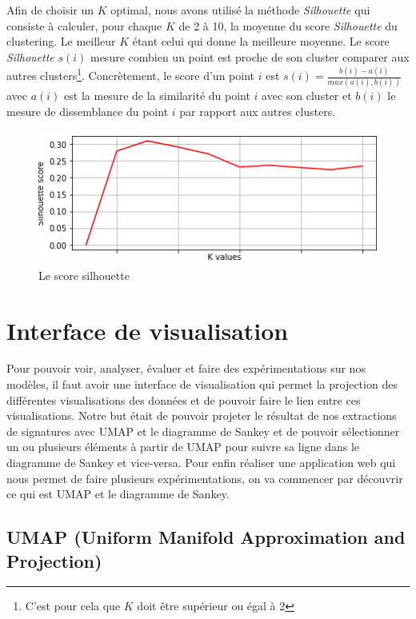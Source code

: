 \documentclass[oneside,13pt,a4paper]{report}
\begin{document}
Afin de choisir un $K$ optimal, nous avons utilisé la méthode \textit{Silhouette} qui consiste à calculer, pour chaque $K$ de 2 à 10, la moyenne du score \textit{Silhouette} du clustering. Le meilleur $K$ étant celui qui donne la meilleure moyenne. Le score \textit{Silhouette} $ s(i) $ mesure combien un point est proche de son cluster comparer aux autres clusters\footnote{C'est pour cela que $ K $ doit être supérieur ou égal à 2}. Concrètement, le score d'un point $i$ est $ s(i) = \frac{b(i) - a(i)}{max(a(i), b(i))} $ avec $a(i)$ est la mesure de la similarité du point $i$ avec son cluster et $b(i)$ le mesure de dissemblance du point $i$ par rapport aux autres clusters.

\begin{figure}[!h]
	\begin{center}
		\includegraphics[width=1.0\textwidth]{img/silhouette.png}
	\end{center}
	\caption{Le score silhouette}
\end{figure}

\section{Interface de visualisation}

Pour pouvoir voir, analyser, évaluer et faire des expérimentations sur nos modèles, il faut avoir une interface de visualisation qui permet la projection des différentes visualisations des données et de pouvoir faire le lien entre ces visualisations.
Notre but était de pouvoir projeter le résultat de nos extractions de signatures avec UMAP et le diagramme de Sankey et de pouvoir sélectionner un ou plusieurs éléments à partir de UMAP pour suivre sa ligne dans le diagramme de Sankey et vice-versa.
Pour enfin réaliser une application web qui nous permet de faire plusieurs expérimentations, on va commencer par découvrir ce qui est UMAP et le diagramme de Sankey.\cite{Visu}

\subsection{UMAP (Uniform Manifold Approximation and Projection)}
\end{document}
